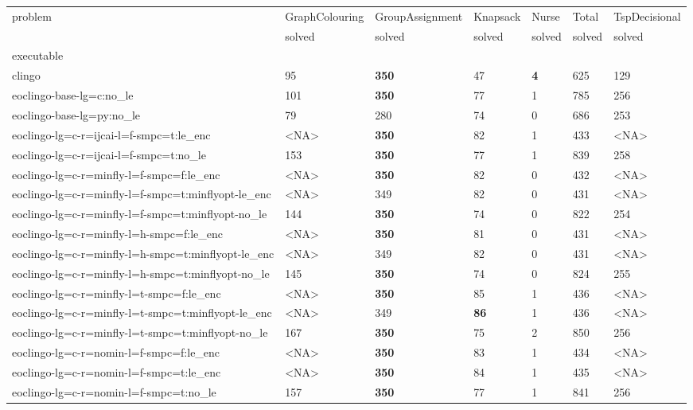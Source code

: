 \documentclass{article}
\begin{document}
            \begin{table}[t!]
\label{tab:results}
\begin{tabular}{lllllll}
\toprule
problem & GraphColouring & GroupAssignment & Knapsack & Nurse & Total & TspDecisional \\
 & solved & solved & solved & solved & solved & solved \\
executable &  &  &  &  &  &  \\
\midrule
clingo & 95 & \textbf{350} & 47 & \textbf{4} & 625 & 129 \\
eoclingo-base-lg=c:no\_le & 101 & \textbf{350} & 77 & 1 & 785 & 256 \\
eoclingo-base-lg=py:no\_le & 79 & 280 & 74 & 0 & 686 & 253 \\
eoclingo-lg=c-r=ijcai-l=f-smpc=t:le\_enc & <NA> & \textbf{350} & 82 & 1 & 433 & <NA> \\
eoclingo-lg=c-r=ijcai-l=f-smpc=t:no\_le & 153 & \textbf{350} & 77 & 1 & 839 & 258 \\
eoclingo-lg=c-r=minfly-l=f-smpc=f:le\_enc & <NA> & \textbf{350} & 82 & 0 & 432 & <NA> \\
eoclingo-lg=c-r=minfly-l=f-smpc=t:minflyopt-le\_enc & <NA> & 349 & 82 & 0 & 431 & <NA> \\
eoclingo-lg=c-r=minfly-l=f-smpc=t:minflyopt-no\_le & 144 & \textbf{350} & 74 & 0 & 822 & 254 \\
eoclingo-lg=c-r=minfly-l=h-smpc=f:le\_enc & <NA> & \textbf{350} & 81 & 0 & 431 & <NA> \\
eoclingo-lg=c-r=minfly-l=h-smpc=t:minflyopt-le\_enc & <NA> & 349 & 82 & 0 & 431 & <NA> \\
eoclingo-lg=c-r=minfly-l=h-smpc=t:minflyopt-no\_le & 145 & \textbf{350} & 74 & 0 & 824 & 255 \\
eoclingo-lg=c-r=minfly-l=t-smpc=f:le\_enc & <NA> & \textbf{350} & 85 & 1 & 436 & <NA> \\
eoclingo-lg=c-r=minfly-l=t-smpc=t:minflyopt-le\_enc & <NA> & 349 & \textbf{86} & 1 & 436 & <NA> \\
eoclingo-lg=c-r=minfly-l=t-smpc=t:minflyopt-no\_le & 167 & \textbf{350} & 75 & 2 & 850 & 256 \\
eoclingo-lg=c-r=nomin-l=f-smpc=f:le\_enc & <NA> & \textbf{350} & 83 & 1 & 434 & <NA> \\
eoclingo-lg=c-r=nomin-l=f-smpc=t:le\_enc & <NA> & \textbf{350} & 84 & 1 & 435 & <NA> \\
eoclingo-lg=c-r=nomin-l=f-smpc=t:no\_le & 157 & \textbf{350} & 77 & 1 & 841 & 256 \\

\end{tabular}
\end{table}
\end{document}

